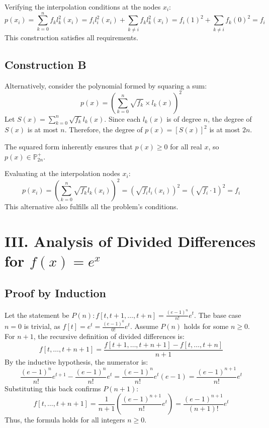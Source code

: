 \documentclass[a4paper]{article}
\begin{document}
Verifying the interpolation conditions at the nodes $x_i$:
\[
p(x_i) = \sum_{k=0}^{n} f_k l_k^2(x_i) = f_i l_i^2(x_i) + \sum_{k \neq i} f_k l_k^2(x_i) = f_i (1)^2 + \sum_{k \neq i} f_k (0)^2 = f_i
\]
This construction satisfies all requirements.

\subsection*{Construction B}

Alternatively, consider the polynomial formed by squaring a sum:
\[
p(x) = \left( \sum_{k=0}^{n} \sqrt{f_k} \times l_k(x) \right)^2
\]
Let $S(x) = \sum_{k=0}^{n} \sqrt{f_k} l_k(x)$. Since each $l_k(x)$ is of degree $n$, the degree of $S(x)$ is at most $n$. Therefore, the degree of $p(x) = [S(x)]^2$ is at most $2n$.

The squared form inherently ensures that $p(x) \ge 0$ for all real $x$, so $p(x) \in \mathbb{P}_{2n}^+$.

Evaluating at the interpolation nodes $x_i$:
\[
p(x_i) = \left( \sum_{k=0}^{n} \sqrt{f_k} l_k(x_i) \right)^2 = \left( \sqrt{f_i} l_i(x_i) \right)^2 = \left( \sqrt{f_i} \cdot 1 \right)^2 = f_i
\]
This alternative also fulfills all the problem's conditions.




\section*{III. Analysis of Divided Differences for $f(x)=e^x$}

\subsection*{Proof by Induction}

Let the statement be $P(n): f[t, t+1, \dots, t+n] = \frac{(e-1)^n}{n!}e^t$.
The base case $n=0$ is trivial, as $f[t] = e^t = \frac{(e-1)^0}{0!}e^t$.
Assume $P(n)$ holds for some $n \ge 0$. For $n+1$, the recursive definition of divided differences is:
\[
f[t, \dots, t+n+1] = \frac{f[t+1, \dots, t+n+1] - f[t, \dots, t+n]}{n+1}
\]
By the inductive hypothesis, the numerator is:
\[
\frac{(e-1)^n}{n!}e^{t+1} - \frac{(e-1)^n}{n!}e^t = \frac{(e-1)^n}{n!}e^t(e-1) = \frac{(e-1)^{n+1}}{n!}e^t
\]
Substituting this back confirms $P(n+1)$:
\[
f[t, \dots, t+n+1] = \frac{1}{n+1} \left( \frac{(e-1)^{n+1}}{n!}e^t \right) = \frac{(e-1)^{n+1}}{(n+1)!}e^t
\]
Thus, the formula holds for all integers $n \ge 0$.
\end{document}
